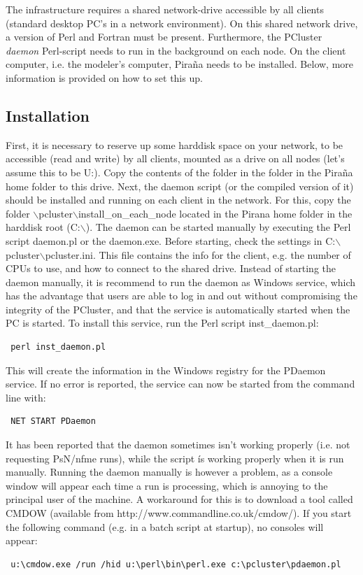 \documentclass[a4,11pt]{report} \usepackage[pdftex]{graphicx}
\begin{document}
{{{The infrastructure requires a shared network-drive accessible by all
clients (standard desktop PC's in a network environment). On this
shared network drive, a version of Perl and Fortran must be
present. Furthermore, the PCluster \textit{daemon} Perl-script
needs to run in the background on each node. On
the client computer, i.e. the modeler's computer, Pira\~na needs to be
installed. Below, more information is provided on how to set this up.

\subsection{Installation} First, it is necessary to reserve up some
harddisk space on your network, to be accessible (read and write) by
all clients, mounted as a drive on all nodes (let's assume this to be
U:). Copy the contents of the folder
 \normalfont in the
 \normalfont folder in the Pira\~na home folder to
this drive. Next, the daemon script (or the compiled version of it) should be
installed and running on each client in the network. For this, copy
the folder $\backslash$pcluster$\backslash$install\_on\_each\_node located in the Pirana home folder in the
harddisk root (C:$\backslash$). The daemon can be started manually by
executing the Perl script daemon.pl or the daemon.exe.  Before
starting, check the settings in
C:$\backslash$pcluster$\backslash$pcluster.ini. This file contains the
info for the client, e.g. the number of CPUs to use, and how to
connect to the shared drive.  Instead of starting the daemon manually, it is recommend to run the daemon as Windows service, which has the advantage that users are able to log in and out without compromising the integrity of the PCluster, and that
the service is automatically started when the PC is started. To
install this service, run the Perl script inst\_daemon.pl:
\begin{verbatim} perl inst_daemon.pl
\end{verbatim} This will create the information in the Windows
registry for the PDaemon service. If no error is reported, the service
can now be started from the command line with:
\begin{verbatim} NET START PDaemon
\end{verbatim}

It has been reported that the daemon sometimes isn't working properly
(i.e. not requesting PsN/nfme runs), while the script \'is working
properly when it is run manually. Running the daemon manually is
however a problem, as a console window will appear each time a run is
processing, which is annoying to the principal user of the machine. A
workaround for this is to download a tool called CMDOW (available from
http://www.commandline.co.uk/cmdow/). If you start the following
command (e.g. in a batch script at startup), no consoles will appear:
\begin{verbatim} u:\cmdow.exe /run /hid u:\perl\bin\perl.exe c:\pcluster\pdaemon.pl
\end{verbatim}

}}}
\end{document}
